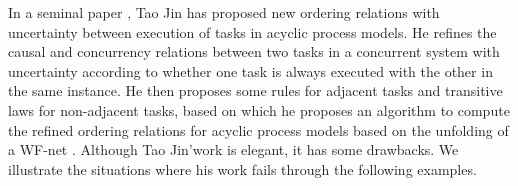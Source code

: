 \documentclass[dvips,...]{llncs}
\begin{document}
In a seminal paper \cite{jin2014computing}, Tao Jin has proposed new ordering relations with uncertainty between execution of tasks in acyclic process models. He refines the causal and concurrency relations between two tasks in a concurrent system with uncertainty according to whether one task is always executed with the other in the same instance. He then proposes some rules for adjacent tasks and transitive laws for non-adjacent tasks, based on which he proposes an algorithm to compute the refined ordering relations for acyclic process models based on the unfolding of a WF-net \cite{mcmillan1995technique,esparza1996improvement}. Although Tao Jin'work is elegant, it has some drawbacks. We illustrate the situations where his work fails through the following examples.

\begin{figure}[htbp]
\centering
{}
\end{figure}
\end{document}
